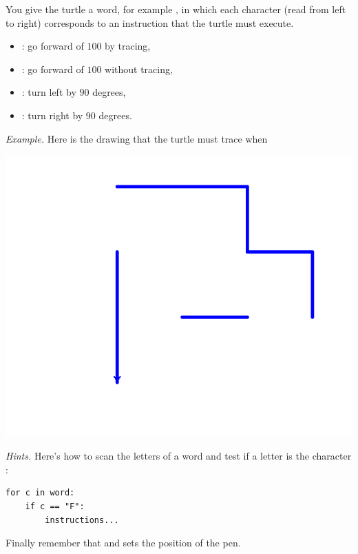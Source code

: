 \documentclass[11pt,class=report,crop=false]{standalone}
\begin{document}
\begin{activite}


You give the turtle a word, for example 
, in which each character (read from left to right) corresponds to an instruction that the turtle must execute.

\begin{itemize}
  \item {} : go forward of $100$ by tracing,
  \item {} : go forward of $100$ without tracing,  
  \item {} : turn left by $90$ degrees,
  \item {} : turn right by $90$ degrees.
\end{itemize}

\emph{Example.}
Here is the drawing that the turtle must trace when

\begin{center}
\includegraphics[scale=\myscale,scale=0.4]{screen-ifthen-2}
\end{center}

\emph{Hints.}
Here's how to scan the letters of a word and test if a letter is the character :
\begin{center}
\begin{minipage}{0.5\textwidth}
\begin{lstlisting}
for c in word:
    if c == "F":
        instructions...
\end{lstlisting}
\end{minipage} 
\end{center} 
Finally remember that  and  sets the position of the pen.

\end{activite}
\end{document}
